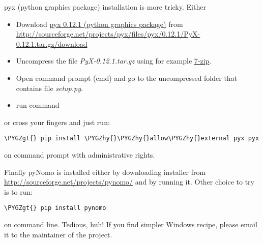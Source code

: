 \documentclass[a4paper,11pt,english]{sphinxmanual}
\def\PYGZgt{\char`\>}
\def\PYGZhy{\char`\-}
\begin{document}
pyx (python graphics package) installation is more tricky. Either
\begin{itemize}
\item {} 
Download \href{http://pyx.sourceforge.net}{pyx 0.12.1 (python graphics package)} from \href{http://sourceforge.net/projects/pyx/files/pyx/0.12.1/PyX-0.12.1.tar.gz/download}{http://sourceforge.net/projects/pyx/files/pyx/0.12.1/PyX-0.12.1.tar.gz/download}

\item {} 
Uncompress the file \emph{PyX-0.12.1.tar.gz} using for example \href{http://www.7-zip.org}{7-zip}.

\item {} 
Open command prompt (cmd) and go to the uncompressed folder that contains file \emph{setup.py}.

\item {} 
run command 

\end{itemize}

or cross your fingers and just run:

\begin{Verbatim}[commandchars=\\\{\},formatcom=\scriptsize]
\PYGZgt{} pip install \PYGZhy{}\PYGZhy{}allow\PYGZhy{}external pyx pyx
\end{Verbatim}

on command prompt with administrative rights.

Finally pyNomo is installed either by downloading installer from  \href{http://sourceforge.net/projects/pynomo/files/pynomo/}{http://sourceforge.net/projects/pynomo/} and by running it. Other choice to try is to run:

\begin{Verbatim}[commandchars=\\\{\},formatcom=\scriptsize]
\PYGZgt{} pip install pynomo
\end{Verbatim}

on command line. Tedious, huh! If you find simpler Windows recipe, please email it to the maintainer of the project.
\end{document}
